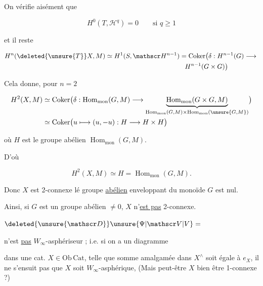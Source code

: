 
On vérifie aisément que

\[
 H^0(T,\mathscr H^q)=0\qquad\text{si }q\geq1
\]

et il reste

\[
 \begin{aligned}
 H^n(\deleted{\unsure{T}}X,M)&\simeq H^1(S,\mathscr H^{n-1})=\operatorname{Coker}\bigl(\delta:H^{n-1}(G)\longrightarrow{}\\
 &\hspace{12em}H^{n-1}(G\times G)\bigr)
 \end{aligned}
\]

Cela donne, pour $n=2$

\[
 \begin{aligned}
 H^2(X,M)&\simeq\operatorname{Coker}\bigl(\delta:\operatorname{Hom}_{\mathrm{mon}}(G,M)\longrightarrow
 \underbrace{\operatorname{Hom}_{\mathrm{mon}}(G\times G,M)}_{\operatorname{Hom}_{\mathrm{mon}}(G,M)\times\operatorname{Hom}_{\mathrm{mon}}(\unsure{G,M})}\bigr)\\
 &\simeq\operatorname{Coker}\bigl(u\longmapsto(u,-u):H\longrightarrow H\times H\bigr)
 \end{aligned}
\]

où $H$ est le groupe abélien $\operatorname{Hom}_{\mathrm{mon}}(G,M)$.

D'où

\[
 H^2(X,M)\simeq H=\operatorname{Hom}_{\mathrm{mon}}(G,M).
\]

Donc $X$ est 2-connexe  lé groupe \uline{abélien} enveloppant du monoïde $G$ est nul.

Ainsi, si $G$ est un groupe abélien $\ne0$, $X$ n'\uline{est pas} 2-connexe.

 \uline{} $\deleted{\unsure{\mathscr D}}\unsure{\Psi|\mathscr V|V}={}$


n'est \uline{pas}  $W_\infty$-asphériseur ; i.e. si on a un diagramme


dans une cat. $X\in\mathrm{Ob}\,\mathrm{Cat}$, telle que  somme amalgamée dans $X^\wedge$ soit égale à $e_X$, il ne s'ensuit pas que $X$ soit $W_\infty$-asphérique, (Mais  peut-être $X$  bien être 1-connexe ?)

